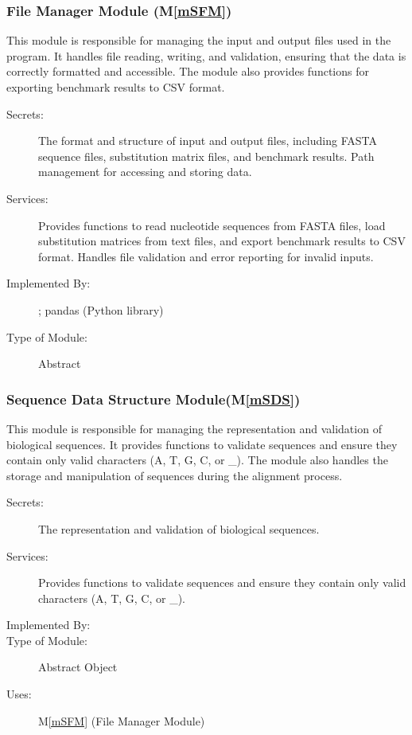 \documentclass[12pt, titlepage]{article}
\newcommand{\mref}[1]{M\ref{#1}}
\begin{document}
\subsubsection{File Manager Module (\mref{mSFM})}
This module is responsible for managing the input and output
files used in the program. It handles file reading, writing, and validation, ensuring that the data is correctly formatted and accessible. 
The module also provides functions for exporting benchmark results to CSV format.
\begin{description}
  \item[Secrets:] The format and structure of input and output files, including FASTA sequence files, substitution matrix files, and benchmark results. Path management for accessing and storing data.
  \item[Services:] Provides functions to read nucleotide sequences from FASTA files, load substitution matrices from text files, and export benchmark results to CSV format. Handles file validation and error reporting for invalid inputs.
  \item[Implemented By:] \progname{}; pandas (Python library)
  \item[Type of Module:] Abstract
\end{description}

\subsubsection{Sequence Data Structure Module(\mref{mSDS})}
This module is responsible for managing the representation and validation of 
biological sequences. It provides functions to validate sequences and ensure 
they contain only valid characters (A, T, G, C, or \_). The module also handles 
the storage and manipulation of sequences during the alignment process.
\begin{description}
  \item[Secrets:] The representation and validation of biological sequences.
  \item[Services:] Provides functions to validate sequences and ensure they contain only valid characters (A, T, G, C, or \_).
  \item[Implemented By:] \progname{}
  \item[Type of Module:] Abstract Object
  \item[Uses:] \mref{mSFM} (File Manager Module)
\end{description}
\end{document}
